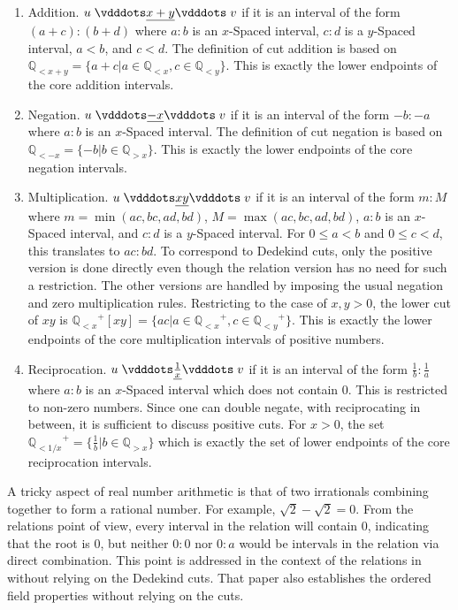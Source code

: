 \documentclass{rmj-public}
\newcommand{\qcut}[2][x]{\ensuremath{\mathbb{Q}_{#2 #1}}}
\newcommand{\qlt}[1][x]{\qcut[#1]{<}}
\newcommand{\qgt}[1][x]{\qcut[#1]{>}}
\begin{document}
\begin{enumerate}
    \item Addition. $u \xrel[x+y] v$ if it is an interval of the form $(a+c):(b+d)$ where $a:b$ is an $x$-Spaced interval, $c:d$ is a $y$-Spaced interval, $a < b$, and $c < d$. The definition of cut addition is based on $\qlt[x+y] = \{a + c | a \in \qlt, c \in \qlt[y]\} $. This is exactly the lower endpoints of the core addition intervals. 
    \item Negation. $u \xrel[-x] v$ if it is an interval of the form $-b:-a$ where $a:b$ is an $x$-Spaced interval. The definition of cut negation is based on $\qlt[-x] = \{-b | b \in \qgt\}$. This is exactly the lower endpoints of the core negation intervals. 
    \item Multiplication. $u \xrel[xy] v$  if it is an interval of the form $m:M$ where $m = \min(ac, bc, ad, bd)$, $M = \max(ac, bc, ad, bd)$, $a:b$ is an $x$-Spaced interval, and $c:d$ is a $y$-Spaced interval. For $0 \leq a < b$ and $0 \leq c < d$, this translates to $ac:bd$. To correspond to Dedekind cuts, only the positive version is done directly even though the relation version has no need for such a restriction. The other versions are handled by imposing the usual negation and zero multiplication rules. Restricting to the case of $x , y > 0$, the lower cut of $xy$ is $\qlt^+[xy] = \{ac | a \in \qlt^+, c \in \qlt[y]^+ \}$. This is exactly the lower endpoints of the core multiplication intervals of positive numbers. 
    \item Reciprocation. $u \xrel[\frac{1}{x}] v$ if it is an interval of the form $\frac{1}{b}:\frac{1}{a}$ where $a:b$ is an $x$-Spaced interval which does not contain 0. This is restricted to non-zero numbers. Since one can double negate, with reciprocating in between, it is sufficient to discuss positive cuts. For $x> 0$, the set $\qlt[1/x]^+ = \{\frac{1}{b} | b \in \qgt\}$ which is exactly the set of lower endpoints of the core reciprocation intervals. 
\end{enumerate}

A tricky aspect of real number arithmetic is that of two irrationals combining together to form a rational number. For example, $\sqrt{2} - \sqrt{2} = 0$. From the relations point of view, every interval in the relation will contain $0$, indicating that the root is $0$, but neither $0:0$ nor $0:a$ would be intervals in the relation via direct combination. This point is addressed in the context of the relations in \cite{taylor23main} without relying on the Dedekind cuts. That paper also establishes the ordered field properties without relying on the cuts. 
\end{document}
